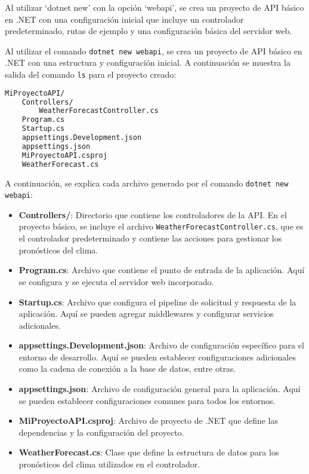 \documentclass[executivepaper]{article}
\begin{document}
Al utilizar \enquote*{dotnet new} con la opción \enquote*{webapi}, se crea un proyecto de API básico en .NET con una configuración inicial que incluye un controlador predeterminado, rutas de ejemplo y una configuración básica del servidor web.

Al utilizar el comando \texttt{dotnet new webapi}, se crea un proyecto de API básico en .NET con una estructura y configuración inicial. A continuación se muestra la salida del comando \texttt{ls} para el proyecto creado:

\begin{lstlisting}[language=bash]
MiProyectoAPI/
    Controllers/
        WeatherForecastController.cs
    Program.cs
    Startup.cs
    appsettings.Development.json
    appsettings.json
    MiProyectoAPI.csproj
    WeatherForecast.cs
\end{lstlisting}

A continuación, se explica cada archivo generado por el comando \texttt{dotnet new webapi}:

\begin{itemize}
  \item \textbf{Controllers/}: Directorio que contiene los controladores de la API. En el proyecto básico, se incluye el archivo \texttt{WeatherForecastController.cs}, que es el controlador predeterminado y contiene las acciones para gestionar los pronósticos del clima.

  \item \textbf{Program.cs}: Archivo que contiene el punto de entrada de la aplicación. Aquí se configura y se ejecuta el servidor web incorporado.

  \item \textbf{Startup.cs}: Archivo que configura el pipeline de solicitud y respuesta de la aplicación. Aquí se pueden agregar middlewares y configurar servicios adicionales.

  \item \textbf{appsettings.Development.json}: Archivo de configuración específico para el entorno de desarrollo. Aquí se pueden establecer configuraciones adicionales como la cadena de conexión a la base de datos, entre otras.

  \item \textbf{appsettings.json}: Archivo de configuración general para la aplicación. Aquí se pueden establecer configuraciones comunes para todos los entornos.

  \item \textbf{MiProyectoAPI.csproj}: Archivo de proyecto de .NET que define las dependencias y la configuración del proyecto.

  \item \textbf{WeatherForecast.cs}: Clase que define la estructura de datos para los pronósticos del clima utilizados en el controlador.

\end{itemize}
\end{document}
